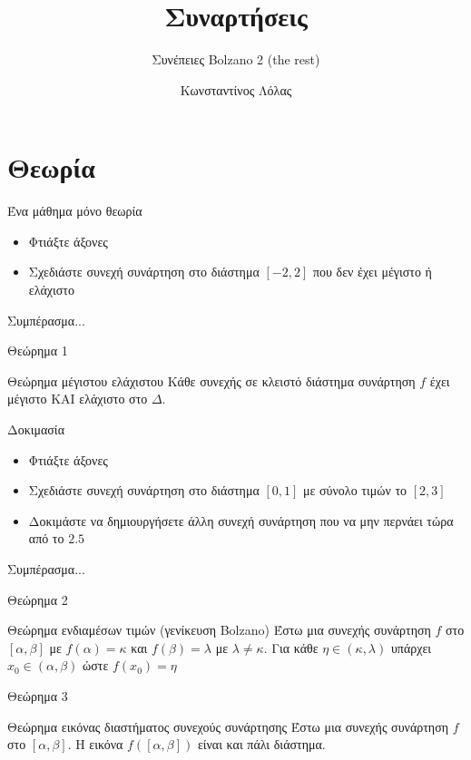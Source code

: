\documentclass{presentation}
\title{Συναρτήσεις}
\subtitle{Συνέπειες Bolzano 2 (the rest)}
\author[Λόλας]{Κωνσταντίνος Λόλας}
\begin{document}
\begin{frame}
  \titlepage
\end{frame}

\section{Θεωρία}
\begin{frame}{Ένα μάθημα μόνο θεωρία}
  \begin{itemize}
    \item<1-> Φτιάξτε άξονες
    \item<2-> Σχεδιάστε συνεχή συνάρτηση στο διάστημα $[-2,2]$ που δεν έχει μέγιστο ή ελάχιστο
  \end{itemize}
  Συμπέρασμα...
\end{frame}

\begin{frame}{Θεώρημα 1}
  \begin{block}{Θεώρημα μέγιστου ελάχιστου}
    Κάθε συνεχής σε κλειστό διάστημα συνάρτηση $f$ έχει μέγιστο ΚΑΙ ελάχιστο στο $Δ$.
  \end{block}
\end{frame}

\begin{frame}{Δοκιμασία}
  \begin{itemize}
    \item<1-> Φτιάξτε άξονες
    \item<2-> Σχεδιάστε συνεχή συνάρτηση στο διάστημα $[0,1]$ με σύνολο τιμών το $[2,3]$
    \item<3-> Δοκιμάστε να δημιουργήσετε άλλη συνεχή συνάρτηση που να μην περνάει τώρα από το $2.5$
  \end{itemize}
  Συμπέρασμα...
\end{frame}

\begin{frame}{Θεώρημα 2}
  \begin{block}{Θεώρημα ενδιαμέσων τιμών (γενίκευση Bolzano)}
    Έστω μια συνεχής συνάρτηση $f$ στο $[α,β]$ με $f(α)=κ$ και $f(β)=λ$ με $λ\ne κ$. Για κάθε $η\in (κ,λ)$ υπάρχει $x_0\in (α,β)$ ώστε $f(x_0)=η$
  \end{block}
\end{frame}

\begin{frame}{Θεώρημα 3}
  \begin{block}{Θεώρημα εικόνας διαστήματος συνεχούς συνάρτησης}
    Έστω μια συνεχής συνάρτηση $f$ στο $[α,β]$. Η εικόνα $f([α,β])$ είναι και πάλι διάστημα.
  \end{block}
\end{frame}
\end{document}
